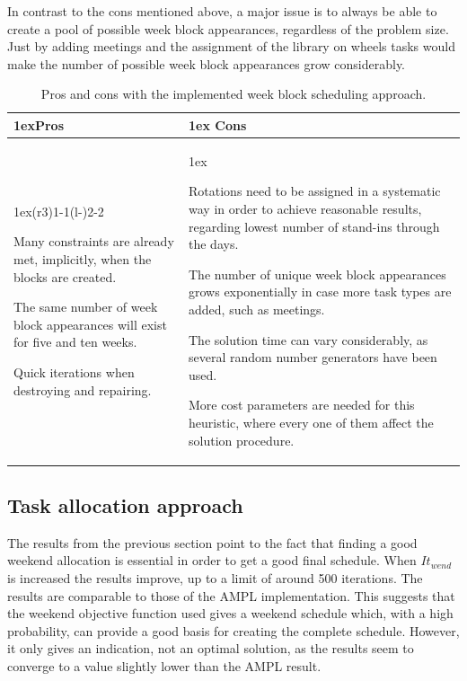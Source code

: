 In contrast to the cons mentioned above, a major issue is to always be able to create a pool of possible week block appearances, regardless of the problem size. Just by adding meetings and the assignment of the library on wheels tasks would make the number of possible week block appearances grow considerably.

\begin{table}[H]
\caption{Pros and cons with the implemented week block scheduling approach.}
\label{tab:pros_cons_weekly_scheduling}
\begin{tabularx}{\linewidth}{>{\parskip1ex}X@{\kern4\tabcolsep}>{\parskip1ex}X}
\toprule
\hfil\bfseries Pros
&
\hfil\bfseries Cons
\\\cmidrule(r{3\tabcolsep}){1-1}\cmidrule(l{-\tabcolsep}){2-2}

Many constraints are already met, implicitly, when the blocks are created. \par
The same number of week block appearances will exist for five and ten weeks.\par
Quick iterations when destroying and repairing.\par

&

Rotations need to be assigned in a systematic way in order to achieve reasonable results, regarding lowest number of stand-ins through the days.\par
The number of unique week block appearances grows exponentially in case more task types are added, such as meetings.\par
The solution time can vary considerably, as several random number generators have been used.\par
More cost parameters are needed for this heuristic, where every one of them affect the solution procedure.

\\\bottomrule
\end{tabularx}
\end{table}

 

\subsection{Task allocation approach}
The results from the previous section point to the fact that finding a good weekend allocation is essential in order to get a good final schedule. When $It_{wend}$ is increased the results improve, up to a limit of around 500 iterations. The results are comparable to those of the AMPL implementation. This suggests that the weekend objective function used gives a weekend schedule which, with a high probability, can provide a good basis for creating the complete schedule. However, it only gives an indication, not an optimal solution, as the results seem to converge to a value slightly lower than the AMPL result. 

